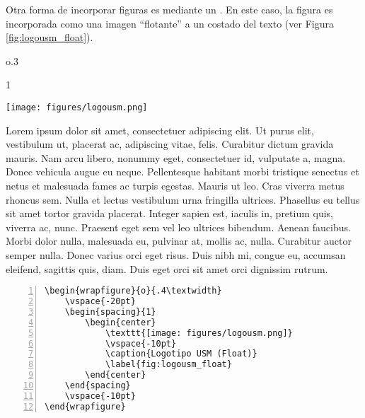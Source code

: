 Otra forma de incorporar figuras es mediante un . En este caso, la figura es incorporada como una imagen ``flotante'' a un costado del texto  (ver Figura \autoref{fig:logousm_float}).

\begin{wrapfigure}{o}{.3\textwidth}
    \vspace{-20pt}
    \begin{spacing}{1}
        \begin{center}
            \texttt{[image: figures/logousm.png]}
            \vspace{-10pt}
            \caption{Logotipo USM (Float)}
            \label{fig:logousm_float}
        \end{center}
    \end{spacing}
    \vspace{-10pt}
\end{wrapfigure}

Lorem ipsum dolor sit amet, consectetuer adipiscing elit. Ut purus elit, vestibulum ut, placerat ac, adipiscing vitae, felis. Curabitur dictum gravida mauris. Nam arcu libero, nonummy eget, consectetuer id, vulputate a, magna. Donec vehicula augue eu neque. Pellentesque habitant morbi tristique senectus et netus et malesuada fames ac turpis egestas. Mauris ut leo. Cras viverra metus rhoncus sem. Nulla et lectus vestibulum urna fringilla ultrices. Phasellus eu tellus sit amet tortor gravida placerat. Integer sapien est, iaculis in, pretium quis, viverra ac, nunc. Praesent eget sem vel leo ultrices bibendum. Aenean faucibus. Morbi dolor nulla, malesuada eu, pulvinar at, mollis ac, nulla. Curabitur auctor semper nulla. Donec varius orci eget risus. Duis nibh mi, congue eu, accumsan eleifend, sagittis quis, diam. Duis eget orci sit amet orci dignissim rutrum.



\begin{Verbatim}[frame=lines, label=\autoref{fig:logousm_float}
				, fontsize=\footnotesize, numbers=left
				, baselinestretch=1
				, formatcom=\color{gray}]
\begin{wrapfigure}{o}{.4\textwidth}
    \vspace{-20pt}
    \begin{spacing}{1}
        \begin{center}
            \texttt{[image: figures/logousm.png]}
            \vspace{-10pt}
            \caption{Logotipo USM (Float)}
            \label{fig:logousm_float}
        \end{center}
    \end{spacing}
    \vspace{-10pt}
\end{wrapfigure}
\end{Verbatim}


